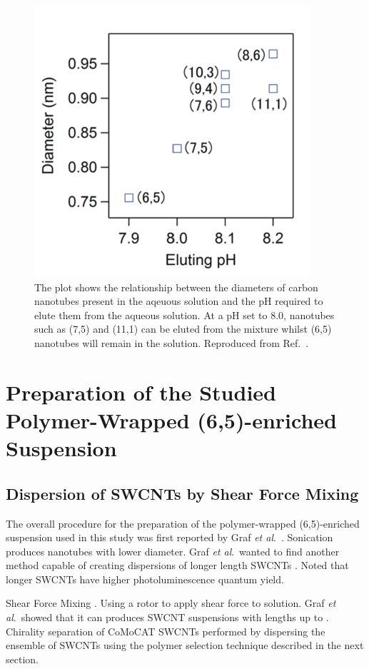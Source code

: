 \begin{figure}[H]
	\centering
	\includegraphics{images/chapter_methods/elute_ph}
	\caption{The plot shows the relationship between the diameters of carbon nanotubes present in the aqeuous solution and the pH required to elute them from the aqueous solution. At a pH set to $8.0$, nanotubes such as (7,5) and (11,1) can be eluted from the mixture whilst (6,5) nanotubes will remain in the solution.  Reproduced from Ref.\ \cite{ichinose2017extraction}.}
	\label{fig:elute_ph}
\end{figure}

\section{Preparation of the Studied Polymer-Wrapped (6,5)-enriched Suspension}

\subsection{Dispersion of SWCNTs by Shear Force Mixing}

The overall procedure for the preparation of the polymer-wrapped (6,5)-enriched suspension used in this study was first reported by Graf \textit{et al}.\ \cite{graf2016large}. Sonication produces nanotubes with lower diameter. Graf \textit{et al}.\ wanted to find another method capable of creating dispersions of longer length SWCNTs \cite{graf2016large}. Noted that longer SWCNTs have higher photoluminescence quantum yield.

Shear Force Mixing \cite{hall2011scaling}. Using a rotor to apply shear force to solution. Graf \textit{et al}.\ showed that it can produces SWCNT suspensions with lengths up to .  Chirality separation of CoMoCAT SWCNTs performed by dispersing the ensemble of SWCNTs using the polymer selection technique described in the next section.

